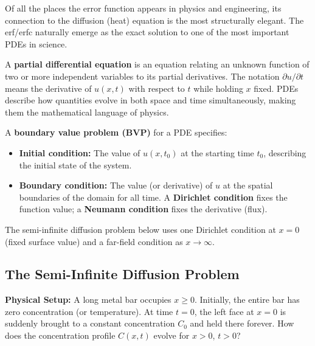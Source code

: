 \documentclass[11pt]{article}
\begin{document}
Of all the places the error function appears in physics and engineering, its connection to the diffusion (heat) equation is the most structurally elegant. The erf/erfc naturally emerge as the exact solution to one of the most important PDEs in science.

\begin{defnbox}
A \textbf{partial differential equation} is an equation relating an unknown function of two or more independent variables to its partial derivatives. The notation $\partial u / \partial t$ means the derivative of $u(x,t)$ with respect to $t$ while holding $x$ fixed. PDEs describe how quantities evolve in both space and time simultaneously, making them the mathematical language of physics.
\end{defnbox}

\begin{defnbox}
A \textbf{boundary value problem (BVP)} for a PDE specifies:
\begin{itemize}[leftmargin=1.5em]
    \item \textbf{Initial condition:} The value of $u(x,t_0)$ at the starting time $t_0$, describing the initial state of the system.
    \item \textbf{Boundary condition:} The value (or derivative) of $u$ at the spatial boundaries of the domain for all time. A \textbf{Dirichlet condition} fixes the function value; a \textbf{Neumann condition} fixes the derivative (flux).
\end{itemize}
The semi-infinite diffusion problem below uses one Dirichlet condition at $x=0$ (fixed surface value) and a far-field condition as $x\to\infty$.
\end{defnbox}

\subsection{The Semi-Infinite Diffusion Problem}

\textbf{Physical Setup:} A long metal bar occupies $x \ge 0$. Initially, the entire bar has zero concentration (or temperature). At time $t = 0$, the left face at $x = 0$ is suddenly brought to a constant concentration $C_0$ and held there forever. How does the concentration profile $C(x,t)$ evolve for $x > 0$, $t > 0$?
\end{document}
